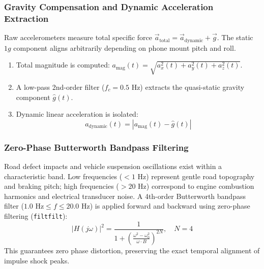 \documentclass[11pt,a4paper]{article}
\begin{document}
\subsubsection{Gravity Compensation and Dynamic Acceleration Extraction}
Raw accelerometers measure total specific force $\vec{a}_{\text{total}} = \vec{a}_{\text{dynamic}} + \vec{g}$. The static $1g$ component aligns arbitrarily depending on phone mount pitch and roll.
\begin{enumerate}
    \item Total magnitude is computed: $a_{\text{mag}}(t) = \sqrt{a_x^2(t) + a_y^2(t) + a_z^2(t)}$.
    \item A low-pass 2nd-order filter ($f_c = 0.5\text{ Hz}$) extracts the quasi-static gravity component $\hat{g}(t)$.
    \item Dynamic linear acceleration is isolated:
    \begin{equation}
    a_{\text{dynamic}}(t) = |a_{\text{mag}}(t) - \hat{g}(t)|
    \end{equation}
\end{enumerate}

\subsubsection{Zero-Phase Butterworth Bandpass Filtering}
Road defect impacts and vehicle suspension oscillations exist within a characteristic band. Low frequencies ($<1\text{ Hz}$) represent gentle road topography and braking pitch; high frequencies ($>20\text{ Hz}$) correspond to engine combustion harmonics and electrical transducer noise.
A 4th-order Butterworth bandpass filter ($1.0\text{ Hz} \le f \le 20.0\text{ Hz}$) is applied forward and backward using zero-phase filtering (\texttt{filtfilt}):
\begin{equation}
|H(j\omega)|^2 = \frac{1}{1 + \left(\frac{\omega^2 - \omega_0^2}{\omega \cdot B}\right)^{2N}}, \quad N=4
\end{equation}
This guarantees zero phase distortion, preserving the exact temporal alignment of impulse shock peaks.
\end{document}
